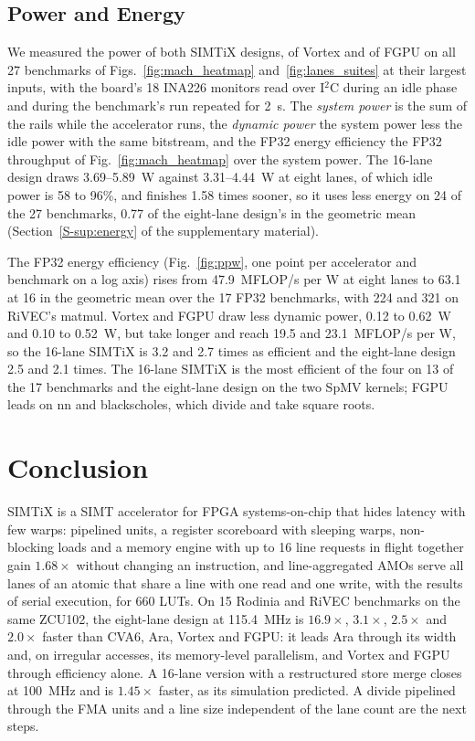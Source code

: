 \documentclass[journal]{IEEEtran}
\begin{document}
\subsection{Power and Energy}\label{sec:evalpower}
We measured the power of both SIMTiX designs, of Vortex and of FGPU on all 27
benchmarks of Figs.~\ref{fig:mach_heatmap} and~\ref{fig:lanes_suites} at their largest
inputs, with the board's 18 INA226 monitors read over I$^2$C during an idle phase and
during the benchmark's run repeated for 2~s. The \emph{system power} is the sum of the
rails while the accelerator runs, the \emph{dynamic power} the system power less the
idle power with the same bitstream, and the FP32 energy efficiency the FP32 throughput
of Fig.~\ref{fig:mach_heatmap} over the system power. The 16-lane design draws
3.69--5.89~W against 3.31--4.44~W at eight lanes, of which idle power is 58 to 96\%,
and finishes 1.58 times sooner, so it uses less energy on 24 of the 27 benchmarks, 0.77
of the eight-lane design's in the geometric mean (Section~\ref{S-sup:energy} of the
supplementary material).

The FP32 energy efficiency (Fig.~\ref{fig:ppw}, one point per accelerator and
benchmark on a log axis) rises from 47.9~MFLOP/s per W at eight lanes to 63.1 at 16 in
the geometric mean over the 17 FP32 benchmarks, with 224 and 321 on RiVEC's matmul.
Vortex and FGPU draw less dynamic power, 0.12 to 0.62~W and 0.10 to 0.52~W, but take
longer and reach 19.5 and 23.1~MFLOP/s per W, so the 16-lane SIMTiX is 3.2 and 2.7
times as efficient and the eight-lane design 2.5 and 2.1 times. The 16-lane SIMTiX is
the most efficient of the four on 13 of the 17 benchmarks and the eight-lane design on
the two SpMV kernels; FGPU leads on nn and blackscholes, which divide and take square
roots.

\section{Conclusion}\label{sec:concl}
SIMTiX is a SIMT accelerator for FPGA systems-on-chip that hides latency with few
warps: pipelined units, a register scoreboard with sleeping warps, non-blocking loads
and a memory engine with up to 16 line requests in flight together gain $1.68\times$
without changing an instruction, and line-aggregated AMOs serve all lanes of an atomic
that share a line with one read and one write, with the results of serial execution,
for 660 LUTs. On 15 Rodinia and RiVEC benchmarks on the same ZCU102, the eight-lane
design at 115.4~MHz is $16.9\times$, $3.1\times$, $2.5\times$ and $2.0\times$ faster
than CVA6, Ara, Vortex and FGPU: it leads Ara through its width and, on irregular
accesses, its memory-level parallelism, and Vortex and FGPU through efficiency alone. A
16-lane version with a restructured store merge closes at 100~MHz and is $1.45\times$
faster, as its simulation predicted. A divide pipelined through the FMA units and a
line size independent of the lane count are the next steps.
\end{document}
